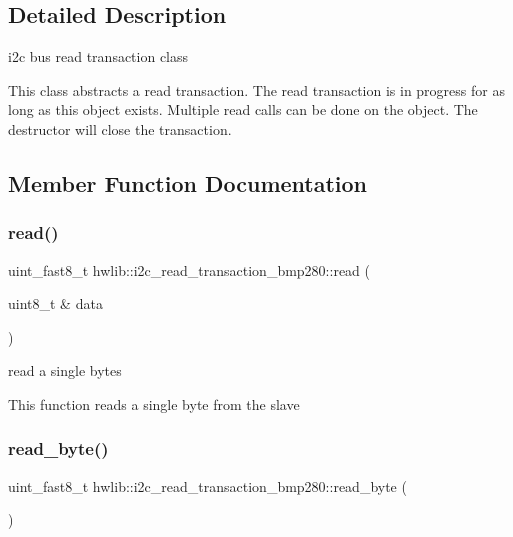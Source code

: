 \subsection{Detailed Description}
i2c bus read transaction class

This class abstracts a read transaction. The read transaction is in progress for as long as this object exists. Multiple read calls can be done on the object. The destructor will close the transaction. 

\subsection{Member Function Documentation}
\mbox{\label{classhwlib_1_1i2c__read__transaction__bmp280_a96d6bcfad832c1fa278305cd59d8756e}} 
\subsubsection{\texorpdfstring{read()}{read()}}
{\footnotesize\ttfamily uint\+\_\+fast8\+\_\+t hwlib\+::i2c\+\_\+read\+\_\+transaction\+\_\+bmp280\+::read (\begin{DoxyParamCaption}\item[{uint8\+\_\+t \&}]{data }\end{DoxyParamCaption})\hspace{0.3cm}{\ttfamily [inline]}}

read a single bytes

This function reads a single byte from the slave \mbox{\label{classhwlib_1_1i2c__read__transaction__bmp280_ae928d38fa75a357dee92717b3888e2e5}} 
\subsubsection{\texorpdfstring{read\_byte()}{read\_byte()}}
{\footnotesize\ttfamily uint\+\_\+fast8\+\_\+t hwlib\+::i2c\+\_\+read\+\_\+transaction\+\_\+bmp280\+::read\+\_\+byte (\begin{DoxyParamCaption}{ }\end{DoxyParamCaption})\hspace{0.3cm}{\ttfamily [inline]}}

